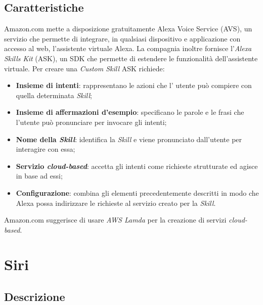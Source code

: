 \documentclass[a4paper,titlepage]{article}
\begin{document}
	\subsection{Caratteristiche}
		Amazon.com mette a disposizione gratuitamente Alexa Voice Service (AVS), un servizio che permette di integrare, in qualsiasi dispositivo e applicazione con accesso al web, l'assistente virtuale Alexa. La compagnia inoltre fornisce l'\textit{Alexa Skills Kit} (ASK), un SDK che permette di estendere le funzionalità dell'assistente virtuale. Per creare una \textit{Custom Skill} ASK richiede:
		\begin{itemize}
			\item \textbf{Insieme di intenti}: rappresentano le azioni che l' utente può compiere con quella determinata \textit{Skill}; 
			\item \textbf{Insieme di affermazioni d'esempio}: specificano le parole e le frasi che l'utente può pronunciare per invocare gli intenti;
			\item \textbf{Nome della \textit{Skill}}: identifica la \textit{Skill} e viene pronunciato dall'utente per interagire con essa;
			\item \textbf{Servizio \textit{cloud-based}}: accetta gli intenti come richieste strutturate ed agisce in base ad essi;
			\item \textbf{Configurazione}: combina gli elementi precedentemente descritti in modo che Alexa possa indirizzare le richieste al servizio creato per la \textit{Skill}.
			
		\end{itemize}
	Amazon.com suggerisce di usare \textit{AWS Lamda} per la creazione di servizi \textit{cloud-based}.
		
	
\newpage	
	\section{Siri}
	\subsection{Descrizione}
	
\end{document}
